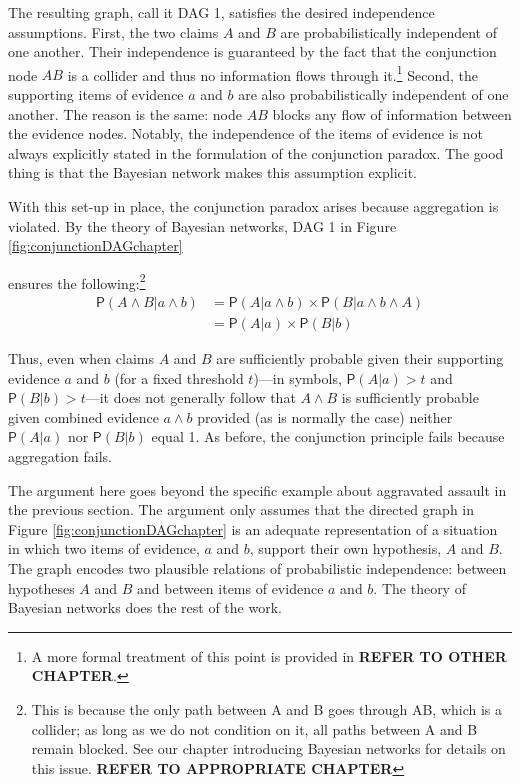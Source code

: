 \documentclass[
  10pt,
  dvipsnames,enabledeprecatedfontcommands]{scrartcl}
\newcommand{\et}{\wedge}
\newcommand{\pr}[1]{\ensuremath{\mathsf{P}(#1)}}
\begin{document}
The resulting graph, call it \textsf{DAG 1}, satisfies the desired
independence assumptions. First, the two claims \(A\) and \(B\) are
probabilistically independent of one another. Their independence is
guaranteed by the fact that the conjunction node \(AB\) is a collider
and thus no information flows through it.\footnote{A more formal
  treatment of this point is provided in
  \textbf{REFER TO OTHER CHAPTER}.} Second, the supporting items of
evidence \(a\) and \(b\) are also probabilistically independent of one
another. The reason is the same: node \(AB\) blocks any flow of
information between the evidence nodes. Notably, the independence of the
items of evidence is not always explicitly stated in the formulation of
the conjunction paradox. The good thing is that the Bayesian network
makes this assumption explicit.

With this set-up in place, the conjunction paradox arises because
aggregation is violated. By the theory of Bayesian networks,
\textsf{DAG 1} in Figure \ref{fig:conjunctionDAGchapter}

ensures the following:\footnote{This is because the only path between
  \textsf{A} and \textsf{B} goes through \textsf{AB}, which is a
  collider; as long as we do not condition on it, all paths between
  \textsf{A} and \textsf{B} remain blocked. See our chapter introducing
  Bayesian networks for details on this issue.
  \textbf{REFER TO APPROPRIATE CHAPTER}} \begin{align*}
\pr{A \wedge  B \vert a \wedge b}& =\pr{A \vert a \wedge b} \times \pr{B \vert  a \wedge b \wedge A}\\
 & = \pr{A \vert a} \times \pr{B \vert  b}
 \end{align*}

\noindent Thus, even when claims \(A\) and \(B\) are sufficiently
probable given their supporting evidence \(a\) and \(b\) (for a fixed
threshold \(t\))---in symbols, \(\pr{A \vert a}>t\) and
\(\pr{B \vert b}>t\)---it does not generally follow that \(A \et B\) is
sufficiently probable given combined evidence \(a\et b\) provided (as is
normally the case) neither \(\pr{A \vert a}\) nor \(\pr{B \vert b}\)
equal 1. As before, the conjunction principle fails because aggregation
fails.

The argument here goes beyond the specific example about aggravated
assault in the previous section. The argument only assumes that the
directed graph in Figure \ref{fig:conjunctionDAGchapter} is an adequate
representation of a situation in which two items of evidence, \(a\) and
\(b\), support their own hypothesis, \(A\) and \(B\). The graph encodes
two plausible relations of probabilistic independence: between
hypotheses \(A\) and \(B\) and between items of evidence \(a\) and
\(b\). The theory of Bayesian networks does the rest of the work.
\end{document}
